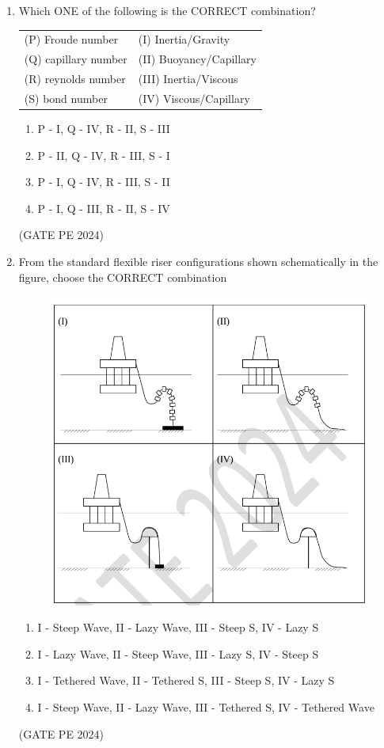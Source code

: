 \documentclass[journal,12pt,onecolumn]{IEEEtran}
\theoremstyle{remark}
\begin{document}
\begin{enumerate}
\item Which ONE of the following is the CORRECT combination?
\begin{tabular}{ll}
(P) Froude number& (I) Inertia/Gravity\\
(Q) capillary number& (II) Buoyancy/Capillary\\
(R) reynolds number& (III) Inertia/Viscous \\
(S) bond number& (IV) Viscous/Capillary \\
\end{tabular}
\begin{enumerate}
    \item P - I, Q - IV, R - II, S - III 
    \item P - II, Q - IV, R - III, S - I 
    \item P - I, Q - IV, R - III, S - II 
    \item P - I, Q - III, R - II, S - IV
\end{enumerate}
\hfill{(GATE PE 2024)}

\item From the standard flexible riser configurations shown schematically in the figure, choose the CORRECT combination
\begin{figure}[H]
    \centering
    \includegraphics[width=0.5\columnwidth]{LQ_42.png}
    \caption{}
    \label{fig:placeholder}
\end{figure}
\begin{enumerate}
    \item I - Steep Wave, II - Lazy Wave, III - Steep S, IV - Lazy S
    \item I - Lazy Wave, II - Steep Wave, III - Lazy S, IV - Steep S
    \item I - Tethered Wave, II - Tethered S, III - Steep S, IV - Lazy S
    \item I - Steep Wave, II - Lazy Wave, III - Tethered S, IV - Tethered Wave
\end{enumerate}
\hfill{(GATE PE 2024)}


\end{enumerate}
\end{document}
